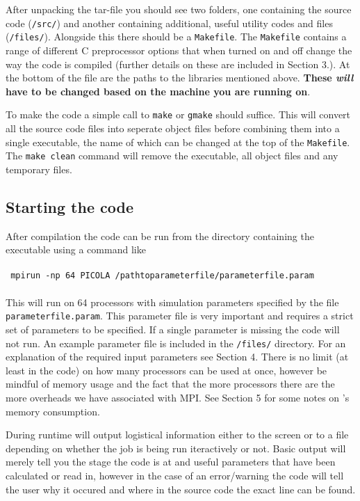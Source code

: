 \documentclass[12pt,twoside,a4paper]{article}
\begin{document}
After unpacking the tar-file you should see two folders, one containing the source code (\texttt{/src/}) and another containing additional, useful utility codes and files (\texttt{/files/}). Alongside this there should be a \texttt{Makefile}.
The \texttt{Makefile} contains a range of different C preprocessor options that when turned on and off change the way the code is compiled (further details on these are included in Section 3.). At the bottom of the file are the paths to the libraries mentioned above. \textbf{These \emph{will} have to be changed based on the machine you are running on}.

To make the code a simple call to \texttt{make} or \texttt{gmake} should suffice. This will convert all the source code files into seperate object files before combining them into a single executable, the name of which can be changed at the top of the \texttt{Makefile}. The \texttt{make clean} command will remove the executable, all object files and any temporary files.

\subsection{Starting the code}
After compilation the code can be run from the directory containing the executable using a command like
\\\\
\indent \texttt{ mpirun -np 64 PICOLA /pathtoparameterfile/parameterfile.param}
\\\\
This will run {\PICOLA} on 64 processors with simulation parameters specified by the file \texttt{parameterfile.param}. This parameter file is very important and requires a strict set of parameters to be specified. If a single parameter is missing the code will not run. An example parameter file is included in the \texttt{/files/} directory. For an explanation of the required input parameters see Section 4. There is no limit (at least in the code) on how many processors can be used at once, however be mindful of memory usage and the fact that the more processors there are the more overheads we have associated with MPI. See Section 5 for some notes on {\PICOLA}'s memory consumption.

During runtime {\PICOLA} will output logistical information either to the screen or to a file depending on whether the job is being run iteractively or not. Basic output will merely tell you the stage the code is at and useful parameters that have been calculated or read in, however in the case of an error/warning the code will tell the user why it occured and where in the source code the exact line can be found.
\end{document}
